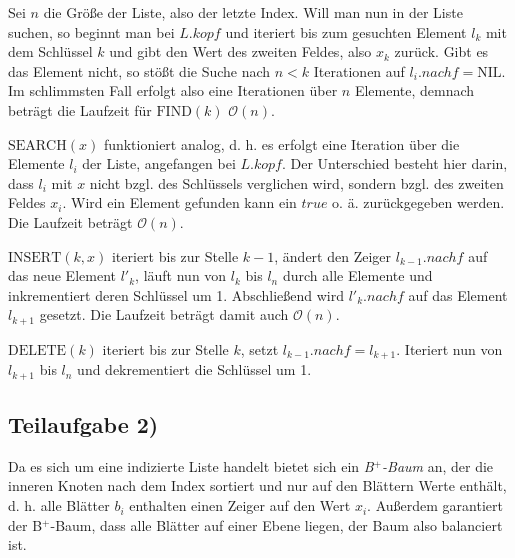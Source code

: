\documentclass[a4paper, fontsize=10pt]{scrartcl}
\begin{document}
Sei $n$ die Größe der Liste, also der letzte Index. Will man nun in der Liste suchen, so beginnt man bei $L.kopf$ und iteriert bis zum gesuchten Element $l_k$ mit dem Schlüssel $k$ und gibt den Wert des zweiten Feldes, also $x_k$ zurück. Gibt es das Element nicht, so stößt die Suche nach $n<k$ Iterationen auf $l_{i}.nachf=\textrm{NIL}$.  Im schlimmsten Fall erfolgt also eine Iterationen über $n$ Elemente, demnach beträgt die Laufzeit für \textbf{$\textrm{FIND}(k)$} $\mathcal{O}(n).$\smallskip

\textbf{$\textrm{SEARCH}(x)$} funktioniert analog, d. h. es erfolgt eine Iteration über die Elemente $l_i$ der Liste, angefangen bei $L.kopf$. Der Unterschied besteht hier darin, dass $l_i$ mit $x$ nicht bzgl. des Schlüssels verglichen wird, sondern bzgl. des zweiten Feldes $x_i$. Wird ein Element gefunden kann ein $true$ o. ä. zurückgegeben werden. Die Laufzeit beträgt  $\mathcal{O}(n)$.\smallskip

\textbf{$\textrm{INSERT}(k,x)$} iteriert bis zur Stelle $k-1$, ändert den Zeiger $l_{k-1}.nachf$ auf das neue Element $l'_k$, läuft nun von $l_k$ bis $l_n$ durch alle Elemente und inkrementiert deren Schlüssel um 1. Abschließend wird $l'_{k}.nachf$ auf das Element $l_{k+1}$ gesetzt. Die Laufzeit beträgt damit auch $\mathcal{O}(n).$\smallskip

\textbf{$\textrm{DELETE}(k)$} iteriert bis zur Stelle $k$, setzt $l_{k-1}.nachf=l_{k+1}$. Iteriert nun von $l_{k+1}$ bis $l_n$ und dekrementiert die Schlüssel um 1.

\subsection*{Teilaufgabe 2)}
Da es sich um eine indizierte Liste handelt bietet sich ein \emph{B$^+$-Baum} an, der die inneren Knoten nach dem Index sortiert und nur auf den Blättern Werte enthält, d. h. alle Blätter $b_i$ enthalten einen Zeiger auf den Wert $x_i$.  Außerdem garantiert der B$^+$-Baum, dass alle Blätter auf einer Ebene liegen, der Baum also balanciert ist. 

\begin{center}
\end{center}
\end{document}

